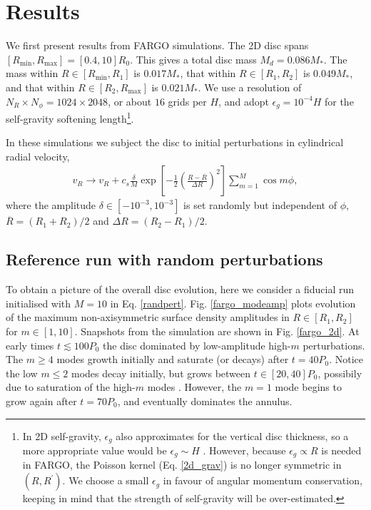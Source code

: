 \section{Results}
We first present results from FARGO simulations. The 2D disc spans
$[R_\mathrm{min}, R_\mathrm{max}] = [0.4,10]R_0$. This gives a total
disc mass $M_{d}=0.086M_*$. The mass within
$R\in[R_\mathrm{min},R_{1}]$ is $0.017M_*$, that within
$R\in[R_{1},R_{2}]$ is $0.049M_*$, and that within
$R\in[R_{2},R_\mathrm{max}]$ is $0.021M_*$. We use a resolution of
$N_R\times N_\phi = 1024\times 2048$, or about $16$ grids per $H$, and
adopt $\epsilon_g=10^{-4}H$ for the   
self-gravity softening length\footnote{In 2D self-gravity, $\epsilon_g$ also
  approximates for the vertical disc thickness, so a more appropriate
  value would be $\epsilon_g\sim H$ \citep{muller12}. However, because
  $\epsilon_g\propto R$ is needed in FARGO, the Poisson kernel
  (Eq. \ref{2d_grav}) is no longer symmetric in $(R,R^\prime)$. We
  choose a small  
  $\epsilon_g$ in favour of angular momentum conservation, keeping in
  mind that the strength of self-gravity will be over-estimated.}.

In these simulations we subject the disc to initial perturbations in 
cylindrical radial velocity, 
\begin{align}\label{randpert}
  v_R \to v_R+ c_s\frac{\delta}{M}
  \exp{\left[-\frac{1}{2}\left(\frac{R-\overline{R}}{\Delta 
        R}\right)^2\right]}\sum_{m=1}^M\cos{m\phi},
\end{align}
where the amplitude $\delta\in[-10^{-3},10^{-3}]$ is set randomly but
independent of $\phi$, $\overline{R} = (R_{1}+R_{2})/2$
and $\Delta R = (R_{2}-R_{1})/2$. 

\subsection{Reference run with random perturbations}
To obtain a picture of the overall disc evolution, here we consider a
fiducial run initialised with $M=10$ in Eq. \ref{randpert}. 
Fig. \ref{fargo_modeamp} plots evolution of the maximum
non-axisymmetric surface density amplitudes in $R\in[R_{1},R_{2}]$
for $m\in[1,10]$. Snapshots from the simulation are shown in
Fig. \ref{fargo_2d}. 
At early times $t\lesssim100P_0$ the disc 
dominated by low-amplitude high-$m$ perturbations. The $m\geq4$ modes
growth initially and saturate (or decays) after $t=40P_0$. Notice the
low $m\leq 2$ modes decay initially, but grows between $t\in[20,40]P_0$,
possibily due to saturation of the high-$m$ modes  
\citep{laughlin96,laughlin97}. However, the $m=1$ mode begins to grow
again after $t=70P_0$, and eventually dominates the annulus. 

